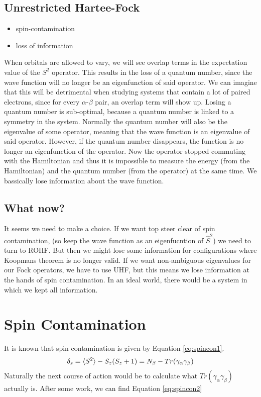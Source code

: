\documentclass{article}
\begin{document}
\subsection{Unrestricted Hartee-Fock}
\label{subsec:UHF}
\begin{itemize}
    \item spin-contamination
    \item loss of information
\end{itemize}
When orbitals are allowed to vary, we will see overlap terms in the expectation value of the $S^2$ operator. This results in the loss of a quantum number, since the wave function 
will no longer be an eigenfunction of said operator. We can imagine that this will be detrimental when studying systems that contain a lot of paired electrons, since for 
every $\alpha$-$\beta$ pair, an overlap term will show up. Losing a quantum number is sub-optimal, because a quantum number is linked to a symmetry in the system. Normally the quantum
number will also be the eigenvalue of some operator, meaning that the wave function is an eigenvalue of said operator. However, if the quantum number disappears, the function is no
longer an eigenfunction of the operator. Now the operator stopped commuting with the Hamiltonian and thus it is impossible to measure the energy (from the Hamiltonian) and the quantum
number (from the operator) at the same time. We bassically lose information about the wave function.

\subsection{What now?}
\label{subsec:outlook}
It seems we need to make a choice. If we want top steer clear of spin contamination, (so keep the wave function as an eigenfucntion of $\hat{S}^2$) we need to turn to ROHF. But then
we might lose some information for configurations where Koopmans theorem is no longer valid. If we want non-ambiguous eigenvalues for our Fock operators, we have to use UHF, but this
means we lose information at the hands of spin contamination. In an ideal world, there would be a system in which we kept all information.



\section{Spin Contamination}
\label{sec:spincon}
It is known that spin contamination is given by Equation \eqref{eq:spincon1}.
\begin{equation}\label{eq:spincon1}
    \delta_s = \braket{S^2} - S_z(S_z + 1) = N_\beta - Tr(\gamma_\alpha\gamma_\beta)
\end{equation}
Naturally the next course of action would be to calculate what $Tr(\gamma_\alpha\gamma_\beta)$ actually is. After some work, we can find Equation \eqref{eq:spincon2}
\end{document}
